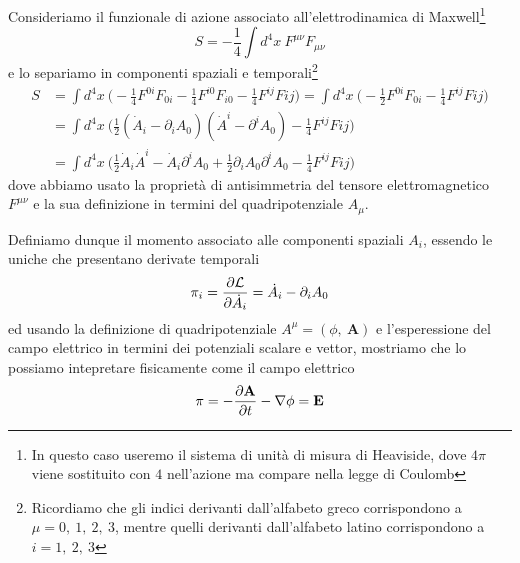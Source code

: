     Consideriamo il funzionale di azione associato all'elettrodinamica di Maxwell\footnote{In questo caso useremo il sistema di unità di misura di Heaviside, dove $4\pi$ viene sostituito con $4$ nell'azione ma compare nella legge di Coulomb}
    \begin{equation*}
        S = - \frac{1}{4} \int d^4 x ~ F^{\mu\nu} F_{\mu\nu}
    \end{equation*}
    e lo separiamo in componenti spaziali e temporali\footnote{Ricordiamo che gli indici derivanti dall'alfabeto greco corrispondono a $\mu = 0, ~1, ~2, ~3$, mentre quelli derivanti dall'alfabeto latino corrispondono a $i = 1, ~2, ~3$}
    \begin{equation*}
    \begin{aligned}
        S & = \int d^4 x ~ \Big ( -\frac{1}{4} F^{0i}F_{0i} - \frac{1}{4} F^{i0}F_{i0} - \frac{1}{4} F^{ij} F{ij} \Big) = \int d^4 x ~ \Big ( -\frac{1}{2} F^{0i}F_{0i} - \frac{1}{4} F^{ij} F{ij} \Big) \\ & = \int d^4 x ~ \Big( \frac{1}{2} (\dot A_i - \partial_i A_0) (\dot A^i - \partial^i A_0) - \frac{1}{4} F^{ij} F{ij} \Big ) \\ & = \int d^4 x ~ \Big (\frac{1}{2} \dot A_i \dot A^i - \dot A_i \partial^i A_0 + \frac{1}{2} \partial_i A_0 \partial^i A_0 - \frac{1}{4} F^{ij} F{ij} \Big )
    \end{aligned}
    \end{equation*}
    dove abbiamo usato la proprietà di antisimmetria del tensore elettromagnetico $F^{\mu\nu}$ e la sua definizione in termini del quadripotenziale $A_\mu$.

    Definiamo dunque il momento associato alle componenti spaziali $A_i$, essendo le uniche che presentano derivate temporali
    \begin{equation} \label{momele}
        \pi_i = \frac{\partial\mathcal L}{\partial\dot A_i} = \dot A_i - \partial_i A_0
    \end{equation}
    ed usando la definizione di quadripotenziale $A^\mu = (\phi, ~ \mathbf A)$ e l'esperessione del campo elettrico in termini dei potenziali scalare e vettor, mostriamo che lo possiamo intepretare fisicamente come il campo elettrico
    \begin{equation*}
        \mathbf \pi = - \frac{\partial\mathbf A}{\partial t} - \nabla \phi = \mathbf E
    \end{equation*}
    
